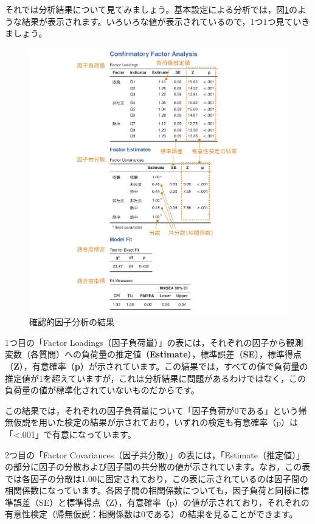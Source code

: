 \documentclass[
  12pt,
  a5jpaper,
  lualatex, ja=standard]{bxjsbook}
\begin{document}
それでは分析結果について見てみましょう。基本設定による分析では，図\ref{fig:factor-cfa-results}のような結果が表示されます。いろいろな値が表示されているので，1つ1つ見ていきましょう。

\begin{figure}[!ht]

{\centering \includegraphics[width=1\linewidth]{images/factor/cfa-results} 

}

\caption{確認的因子分析の結果}\label{fig:factor-cfa-results}
\end{figure}

1つ目の「Factor Loadings（因子負荷量）」の表には，それぞれの因子から観測変数（各質問）への負荷量の推定値（\textbf{Estimate}），標準誤差（\textbf{SE}），標準得点（\textbf{Z}），有意確率（\textbf{p}）が示されています。この結果では，すべての値で負荷量の推定値が1を超えていますが，これは分析結果に問題があるわけではなく，この負荷量の値が標準化されていないものだからです。

この結果では，それぞれの因子負荷量について「因子負荷が0である」という帰無仮説を用いた検定の結果が示されており，いずれの検定も有意確率（p）は「\textless.001」で有意になっています。

2つ目の「Factor Covariances（因子共分散）」の表には，「Estimate（推定値）」の部分に因子の分散および因子間の共分散の値が示されています。なお，この表では各因子の分散は1.00に固定されており，この表に示されているのは因子間の相関係数になっています。各因子間の相関係数についても，因子負荷と同様に標準誤差（SE）と標準得点（Z），有意確率（p）の値が示されており，それぞれの有意性検定（帰無仮説：相関係数は0である）の結果を見ることができます。
\end{document}
